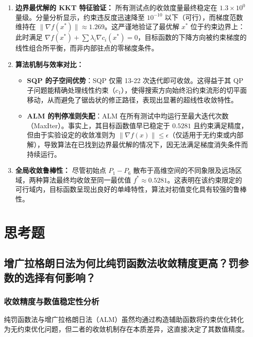 \documentclass[a4paper,12pt]{article}
\begin{document}
\begin{enumerate}
    \item \textbf{边界最优解的 KKT 特征验证：}
    所有测试点的收敛度量最终稳定在 $1.3 \times 10^0$ 量级。分量分析显示，约束违反度迅速降至 $10^{-10}$ 以下（可行），而梯度范数维持在 $\|\nabla f(x^*)\| \approx 1.269$。这严谨地验证了最优解 $x^*$ 位于约束边界上：此时满足 $\nabla f(x^*) + \sum \lambda_i \nabla c_i(x^*) = 0$，目标函数的下降方向被约束梯度的线性组合所平衡，而非内部驻点的零梯度条件。

    \item \textbf{算法机制与效率对比：}
    \begin{itemize}
        \item \textbf{SQP 的子空间优势}：SQP 仅需 13-22 次迭代即可收敛。这得益于其 QP 子问题能精确处理线性约束（$c_1$），使得搜索方向始终沿约束流形的切平面移动，从而避免了锯齿状的修正路径，表现出显著的超线性收敛特性。
        \item \textbf{ALM 的判停准则失配}：ALM 在所有测试中均运行至最大迭代次数（MaxIter）。事实上，其目标函数值早已稳定于 $0.5281$ 且约束满足精度，但由于实验设定的收敛准则为 $\|\nabla f(x)\| \le \epsilon$（仅适用于无约束或内部解），导致算法在已找到边界最优解的情况下，因无法满足梯度消失条件而持续运行。
    \end{itemize}

    \item \textbf{全局收敛鲁棒性：}
    尽管初始点 $P_1-P_6$ 散布于高维空间的不同象限及远场区域，两种算法最终均收敛至同一最优值 $f^* \approx 0.5281$。这表明在该约束限定的可行域内，目标函数呈现出良好的单峰特性，算法对初值变化具有较强的鲁棒性。
\end{enumerate}


\section{思考题}

\subsection{增广拉格朗日法为何比纯罚函数法收敛精度更高？罚参数的选择有何影响？}

\subsubsection{收敛精度与数值稳定性分析}
纯罚函数法与增广拉格朗日法（ALM）虽然均通过构造辅助函数将约束优化转化为无约束优化问题，但二者的收敛机制存在本质差异，这直接决定了其数值精度。
\end{document}
